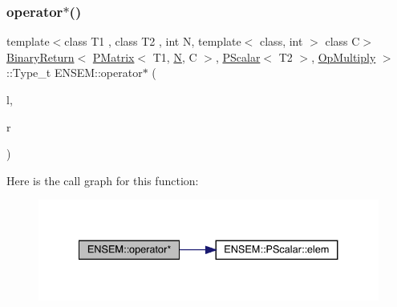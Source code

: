 \subsubsection{\texorpdfstring{operator$\ast$()}{operator*()}\hspace{0.1cm}{\footnotesize\ttfamily [1/3]}}
{\footnotesize\ttfamily template$<$class T1 , class T2 , int N, template$<$ class, int $>$ class C$>$ \\
\mbox{\hyperlink{structENSEM_1_1BinaryReturn}{Binary\+Return}}$<$ \mbox{\hyperlink{classENSEM_1_1PMatrix}{P\+Matrix}}$<$ T1, \mbox{\hyperlink{adat__devel_2lib_2hadron_2operator__name__util_8cc_a7722c8ecbb62d99aee7ce68b1752f337}{N}}, C $>$, \mbox{\hyperlink{classENSEM_1_1PScalar}{P\+Scalar}}$<$ T2 $>$, \mbox{\hyperlink{structENSEM_1_1OpMultiply}{Op\+Multiply}} $>$\+::Type\+\_\+t E\+N\+S\+E\+M\+::operator$\ast$ (\begin{DoxyParamCaption}\item[{const \mbox{\hyperlink{classENSEM_1_1PMatrix}{P\+Matrix}}$<$ T1, \mbox{\hyperlink{adat__devel_2lib_2hadron_2operator__name__util_8cc_a7722c8ecbb62d99aee7ce68b1752f337}{N}}, C $>$ \&}]{l,  }\item[{const \mbox{\hyperlink{classENSEM_1_1PScalar}{P\+Scalar}}$<$ T2 $>$ \&}]{r }\end{DoxyParamCaption})\hspace{0.3cm}{\ttfamily [inline]}}

Here is the call graph for this function\+:\nopagebreak
\begin{figure}[H]
\begin{center}
\leavevmode
\includegraphics[width=334pt]{df/d0a/group__primmatrix_ga9edd8305793268c1fbc1b874baa000d3_cgraph}
\end{center}
\end{figure}
\mbox{\label{group__primmatrix_ga2f9521924540b40d00ad4aa1606bfb22}} 
